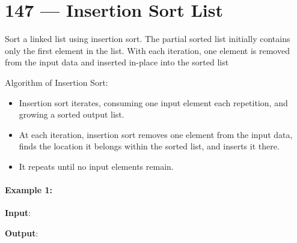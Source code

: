 \section{147 --- Insertion Sort List}
Sort a linked list using insertion sort.  The partial sorted list initially contains only the first element in the list. With each iteration, one element is removed from the input data and inserted in-place into the sorted list
\par
Algorithm of Insertion Sort:
\begin{itemize}
    \item Insertion sort iterates, consuming one input element each repetition, and growing a sorted output list.
    \item At each iteration, insertion sort removes one element from the input data, finds the location it belongs within the sorted list, and inserts it there.
    \item It repeats until no input elements remain.
\end{itemize}
\paragraph{Example 1:}
\begin{flushleft}
\textbf{Input}:
\begin{figure}[H]
\end{figure}
\textbf{Output}: 
\begin{figure}[H]
\end{figure}
\end{flushleft}
